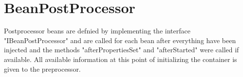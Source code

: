 \section{BeanPostProcessor}
\label{feature:BeanPostProcessor}
\ClearAPI
Postprocessor beans are defnied by implementing the interface "IBeanPostProcessor" and are called for each bean after everything have been injected and the methods "afterPropertiesSet" and "afterStarted" were called if available. All available information at this point of initializing the container is given to the preprocessor.